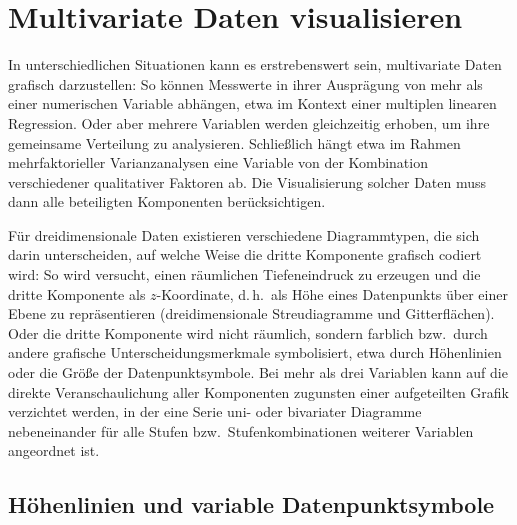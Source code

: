 \section{Multivariate Daten visualisieren}
\label{sec:3dPlot}

In unterschiedlichen Situationen kann es erstrebenswert sein, multivariate Daten grafisch darzustellen: So können Messwerte in ihrer Ausprägung von mehr als einer numerischen Variable abhängen, etwa im Kontext einer multiplen linearen Regression. Oder aber mehrere Variablen werden gleichzeitig erhoben, um ihre gemeinsame Verteilung zu analysieren. Schließlich hängt etwa im Rahmen mehrfaktorieller Varianzanalysen eine Variable von der Kombination verschiedener qualitativer Faktoren ab. Die Visualisierung solcher Daten muss dann alle beteiligten Komponenten berücksichtigen.

Für dreidimensionale Daten existieren verschiedene Diagrammtypen, die sich darin unterscheiden, auf welche Weise die dritte Komponente grafisch codiert wird: So wird versucht, einen räumlichen Tiefeneindruck zu erzeugen und die dritte Komponente als $z$-Koordinate, d.\,h.\ als Höhe eines Datenpunkts über einer Ebene zu repräsentieren (dreidimensionale Streudiagramme und Gitterflächen). Oder die dritte Komponente wird nicht räumlich, sondern farblich bzw.\ durch andere grafische Unterscheidungsmerkmale symbolisiert, etwa durch Höhenlinien oder die Größe der Datenpunktsymbole. Bei mehr als drei Variablen kann auf die direkte Veranschaulichung aller Komponenten zugunsten einer aufgeteilten Grafik verzichtet werden, in der eine Serie uni- oder bivariater Diagramme nebeneinander für alle Stufen bzw.\ Stufenkombinationen weiterer Variablen angeordnet ist.

\subsection{Höhenlinien und variable Datenpunktsymbole}
\label{sec:3dContour}

